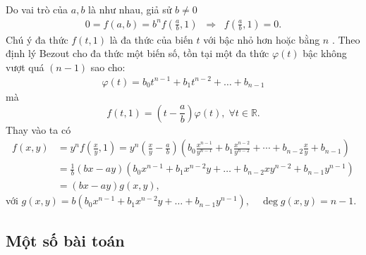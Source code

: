 Do vai trò của $a,b$ là như nhau, giả sử $b\ne 0$
\begin{align*}
0=f(a,b)=b^nf\left(\frac{a}{b},1\right)\;\;\Longrightarrow \;\;f\left(\frac{a}{b},1\right)=0.
\end{align*}
Chú ý đa thức $f(t,1)$  là đa thức của biến $t$ với bậc nhỏ hơn hoặc bằng $n$ . Theo định lý Bezout cho đa thức một biến số, tồn tại một đa thức $\varphi(t)$ bậc không vượt quá $(n-1)$  sao cho:
\begin{align*}
\varphi(t)=b_0t^{n-1}+b_1t^{n-2}+\hdots +b_{n-1}
\end{align*}
mà $$f(t,1)=\left(t-\dfrac{a}{b}\right)\varphi(t),\;\forall t\in\mathbb{R}.$$
Thay vào ta có
\begin{align*}
f(x,y)&=y^nf\left(\frac{x}{y},1\right)=y^n\left(\frac{x}{y}-\frac{a}{b}\right)\left(b_0\frac{x^{n-1}}{y^{n-1}}+b_1\frac{x^{n-2}}{y^{n-2}}+\cdots +b_{n-2}\frac{x}{y}+b_{n-1}\right)\\
&=\frac{1}{b}\left(bx-ay\right)\left(b_0x^{n-1}+b_1x^{n-2}y+\hdots +b_{n-2}xy^{n-2}+b_{n-1}y^{n-1}\right)\\
&=\left(bx-ay\right)g(x,y),
\end{align*}
với $g(x,y)=b\left(b_0x^{n-1}+b_1x^{n-2}y+\hdots +b_{n-1}y^{n-1}\right),\quad \deg g(x,y)=n-1$.
\subsection{Một số bài toán}



